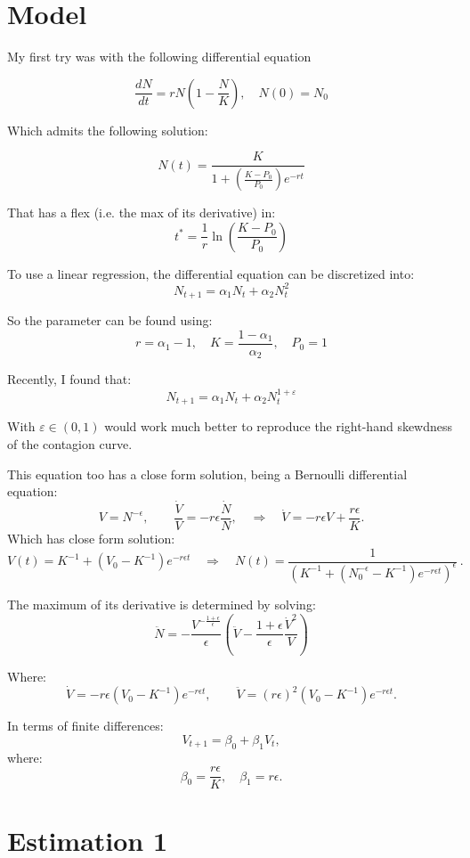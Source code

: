 \documentclass[12pt]{article}
\begin{document}
    \section{Model}
    My first try was with the following differential equation

    $$\frac{dN}{dt} = r N \left(1-\frac{N}{K}\right), \quad N(0)=N_0$$

    Which admits the following solution:

    $$N(t) = \frac{K}{1+ \left(\frac{K-P_0}{P_0}\right) e^{-rt}}$$

    That has a flex (i.e. the max of its derivative) in:
    $$ t^* = \frac{1}{r}\ln \left(\frac{K-P_0}{P_0}\right)$$

    To use a linear regression, the differential equation can be discretized into:
    $$ N_{t+1} = \alpha_1 N_t + \alpha_2 N_{t}^2$$

    So the parameter can be found using:
    $$ r = \alpha_1-1, \quad K= \frac{1-\alpha_1}{\alpha_2}, \quad P_0 = 1$$

    Recently, I found that:
    \begin{equation}
        N_{t+1} = \alpha_1 N_t + \alpha_2 N_{t}^{1 + \varepsilon}\label{eq:equation0}
    \end{equation}

    With $\varepsilon \in (0,1)$ would work much better to reproduce the right-hand skewdness of the contagion curve.

    This equation too has a close form solution, being a Bernoulli differential equation:
    $$V = N^{-\epsilon}, \qquad \frac{\dot V}{V} = -r \epsilon \frac{\dot N}{N}, \quad \Rightarrow \quad \dot V = -r\epsilon V + \frac{r\epsilon}{K}. $$
    Which has close form solution:
    $$ V(t) = K^{-1} + \left(V_0-K^{-1}\right)e^{-r\epsilon t} \quad \Rightarrow \quad N(t)=\frac{1}{\left(K^{-1} + \left(N_0^{-\epsilon}-K^{-1}\right)e^{-r\epsilon t}\right)^\epsilon}\,.$$

    The maximum of its derivative is determined by solving:
    $$ \ddot N = -\frac{V^{-\frac{1+\epsilon}{\epsilon}}}{\epsilon} \left(\ddot V -\frac{1+\epsilon}{\epsilon} \frac{\dot V ^2}{V}\right)$$

    Where:
    $$ \dot V = -r\epsilon\left(V_0-K^{-1}\right)e^{-r\epsilon t}, \qquad \ddot V = (r\epsilon)^2 \left(V_0-K^{-1}\right)e^{-r\epsilon t}. $$

    In terms of finite differences:
    $$ V_{t+1} = \beta_0 + \beta_1 V_t,$$
    where:
    $$\beta_0 = \frac{r \epsilon}{K}, \quad \beta_1=  r\epsilon.$$

    \section{Estimation 1}\label{sec:estimation}
    
\end{document}
